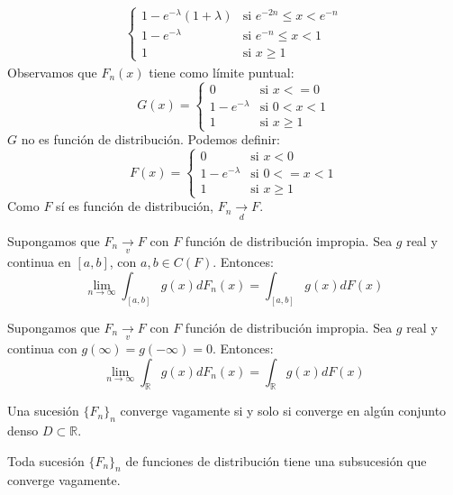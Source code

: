 \begin{exercise}
\begin{align*}
\begin{cases}
                       1 - e^{-\lambda}(1+\lambda) & \text{si } e^{-2n} \leq x < e^{-n} \\
                       1 - e^{-\lambda}            & \text{si } e^{-n} \leq x < 1       \\
                       1                           & \text{si } x \geq 1
                   \end{cases}
    \end{align*}
    Observamos que $F_n(x)$ tiene como límite puntual:
    $$G(x) = \begin{cases}
            0              & \text{si } x <= 0    \\
            1-e^{-\lambda} & \text{si } 0 < x < 1 \\
            1              & \text{si } x \geq 1
        \end{cases}$$
    $G$ no es función de distribución.
    Podemos definir:
    $$F(x) = \begin{cases}
            0              & \text{si } x < 0      \\
            1-e^{-\lambda} & \text{si } 0 <= x < 1 \\
            1              & \text{si } x \geq 1
        \end{cases}$$
    Como $F$ sí es función de distribución, $F_n \xrightarrow[d]{} F$.
\end{exercise}

\begin{theorem}
    Supongamos que $F_n \xrightarrow[v]{} F$ con $F$ función de distribución impropia.
    Sea $g$ real y continua en $[a, b]$, con $a, b \in C(F)$. Entonces:
    $$\lim\limits_{n \to \infty} \int_{[a,b]} g(x)dF_n(x) = \int_{[a,b]} g(x)dF(x)$$
\end{theorem}

\begin{theorem}
    Supongamos que $F_n \xrightarrow[v]{} F$ con $F$ función de distribución impropia.
    Sea $g$ real y continua con $g(\infty) = g(-\infty) = 0$. Entonces:
    $$\lim\limits_{n \to \infty} \int_\mathbb{R} g(x)dF_n(x) = \int_\mathbb{R} g(x)dF(x)$$
\end{theorem}

\begin{lemma}
    Una sucesión $\{F_n\}_n$ converge vagamente si y solo si converge en algún conjunto denso $D \subset \mathbb{R}$.
\end{lemma}

\begin{theorem}
    Toda sucesión $\{F_n\}_n$ de funciones de distribución tiene una subsucesión que converge vagamente.
\end{theorem}

